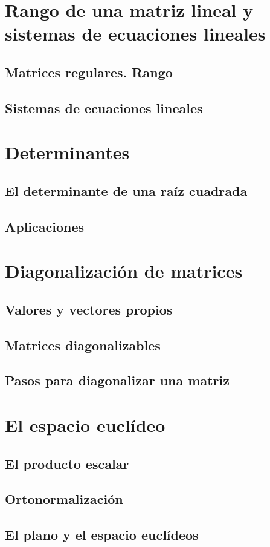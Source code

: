 \documentclass[11pt, oneside, titlepage]{article}
\begin{document}
\section{Rango de una matriz lineal y sistemas de ecuaciones lineales}
\subsection{Matrices regulares. Rango}
\subsection{Sistemas de ecuaciones lineales}
\section{Determinantes}
\subsection{El determinante de una raíz cuadrada}
\subsection{Aplicaciones}
\section{Diagonalización de matrices}
\subsection{Valores y vectores propios}
\subsection{Matrices diagonalizables}
\subsection{Pasos para diagonalizar una matriz}
\section{El espacio euclídeo}
\subsection{El producto escalar}
\subsection{Ortonormalización}
\subsection{El plano y el espacio euclídeos}
\end{document}
